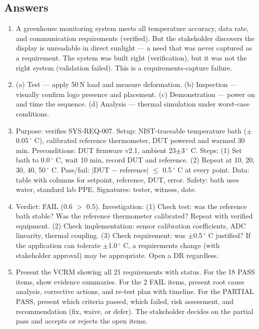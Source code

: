 \documentclass[11pt,letterpaper,twoside,openany]{book}
\begin{document}
\subsection{Answers}
\begin{enumerate}[leftmargin=1.5em]
\item A greenhouse monitoring system meets all temperature accuracy, data rate, and communication requirements (verified). But the stakeholder discovers the display is unreadable in direct sunlight --- a need that was never captured as a requirement. The system was built right (verification), but it was not the right system (validation failed). This is a requirements-capture failure.
\item (a) Test --- apply 50\,N load and measure deformation. (b) Inspection --- visually confirm logo presence and placement. (c) Demonstration --- power on and time the sequence. (d) Analysis --- thermal simulation under worst-case conditions.
\item Purpose: verifies SYS-REQ-007. Setup: NIST-traceable temperature bath ($\pm$0.05\,$^{\circ}$ C), calibrated reference thermometer, DUT powered and warmed 30 min. Preconditions: DUT firmware v2.1, ambient 23$\pm$3\,$^{\circ}$ C. Steps: (1) Set bath to 0.0\,$^{\circ}$ C, wait 10 min, record DUT and reference. (2) Repeat at 10, 20, 30, 40, 50\,$^{\circ}$ C. Pass/fail: $|$DUT $-$ reference$|$ $\leq$ 0.5\,$^{\circ}$ C at every point. Data: table with columns for setpoint, reference, DUT, error. Safety: bath uses water, standard lab PPE. Signatures: tester, witness, date.
\item Verdict: FAIL (0.6 $>$ 0.5). Investigation: (1) Check test: was the reference bath stable? Was the reference thermometer calibrated? Repeat with verified equipment. (2) Check implementation: sensor calibration coefficients, ADC linearity, thermal coupling. (3) Check requirement: was $\pm$0.5\,$^{\circ}$ C justified? If the application can tolerate $\pm$1.0\,$^{\circ}$ C, a requirements change (with stakeholder approval) may be appropriate. Open a DR regardless.
\item Present the VCRM showing all 21 requirements with status. For the 18 PASS items, show evidence summaries. For the 2 FAIL items, present root cause analysis, corrective actions, and re-test plan with timeline. For the PARTIAL PASS, present which criteria passed, which failed, risk assessment, and recommendation (fix, waive, or defer). The stakeholder decides on the partial pass and accepts or rejects the open items.
\end{enumerate}
\end{document}
